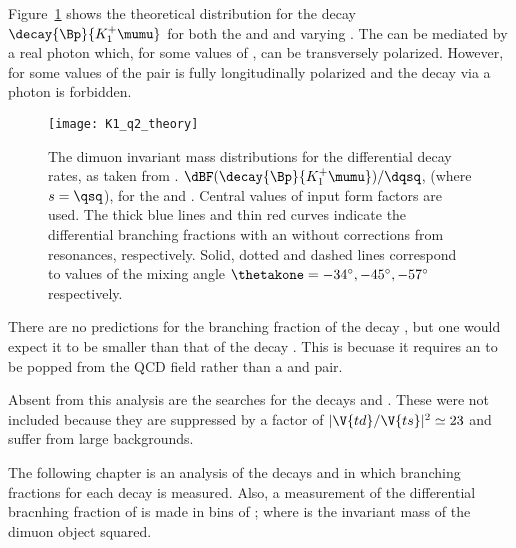 Figure~\ref{fig:th:thetak1} shows the theoretical \qsq distribution for the decay
$\decay{\Bp}{K_1^+\mumu}$ for both the  and  and varying \thetakone.
The  can be mediated by a real photon which, for some values of \thetakone, can be
transversely polarized.
However, for some values of \thetakone the \mumu pair is fully longitudinally polarized and the
decay via a photon is forbidden.

\begin{figure}
  \begin{center}
    \texttt{[image: K1\_q2\_theory]}
    \caption[Theoretical \qsq distribution for $\decay{\Bp}{K_1^+\mumu}$]
    {\small
      The dimuon invariant mass distributions for the differential decay rates, as taken from
      .
      $\dBF(\decay{\Bp}{K_1^+\mumu})/\dqsq$, (where $s=\qsq$), for the  and .
      Central values of input form factors are used.
      The thick blue lines and thin red curves indicate the differential branching fractions with
      an without corrections from resonances, respectively.
      Solid, dotted and dashed lines correspond to values of the mixing angle
      $\thetakone=-34^\circ,-45^\circ,-57^\circ$ respectively.
    }
    \label{fig:th:thetak1}
  \end{center}
\end{figure}

There are no predictions for the branching fraction of the decay \btophikmumu,
but one would expect it to be smaller than that of the decay \btokpipimumu.
This is becuase it requires an \ssbar to be popped from the QCD field rather than a \uubar and
\ddbar pair.

Absent from this analysis are the searches for the decays \decay{\Bp}{\Kp\Km\pip\mumu}
and \decay{\Bp}{\pipi\pim\mumu}.
These were not included because they are suppressed by a factor of $|\V{td}/\V{ts}|^2\simeq23$ and
suffer from large backgrounds.

The following chapter is an analysis of the decays \btokpipimumu and \btophikmumu in which
branching fractions for each decay is measured.
Also, a measurement of the differential bracnhing fraction of \btokpipimumu is made in bins of
\qsq; where \qsq is the invariant mass of the dimuon object squared.






